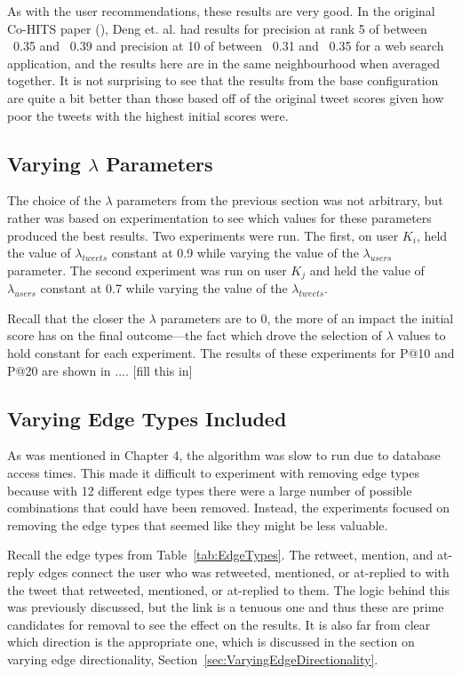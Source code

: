 As with the user recommendations, these results are very good. In the original Co-HITS paper (\cite{Deng2009}), Deng et. al. had results for precision at rank 5 of between ~0.35 and ~0.39 and precision at 10 of between ~0.31 and ~0.35 for a web search application, and the results here are in the same neighbourhood when averaged together. It is not surprising to see that the results from the base configuration are quite a bit better than those based off of the original tweet scores given how poor the tweets with the highest initial scores were.



\subsection{Varying $\lambda$ Parameters}
\label{sec:VaryingLambda}

The choice of the $\lambda$ parameters from the previous section was not arbitrary, but rather was based on experimentation to see which values for these parameters produced the best results. Two experiments were run. The first, on user $K_{i}$, held the value of $\lambda_{tweets}$ constant at 0.9 while varying the value of the $\lambda_{users}$ parameter. The second experiment was run on user $K_{j}$ and held the value of $\lambda_{users}$ constant at 0.7 while varying the value of the $\lambda_{tweets}$.

Recall that the closer the $\lambda$ parameters are to 0, the more of an impact the initial score has on the final outcome---the fact which drove the selection of $\lambda$ values to hold constant for each experiment. The results of these experiments for P@10 and P@20 are shown in .... [fill this in]



\subsection{Varying Edge Types Included}
\label{sec:VaryingEdgeTypes}

As was mentioned in Chapter 4, the algorithm was slow to run due to database access times. This made it difficult to experiment with removing edge types because with 12 different edge types there were a large number of possible combinations that could have been removed. Instead, the experiments focused on removing the edge types that seemed like they might be less valuable.

Recall the edge types from Table~\ref{tab:EdgeTypes}. The retweet, mention, and at-reply edges connect the user who was retweeted, mentioned, or at-replied to with the tweet that retweeted, mentioned, or at-replied to them. The logic behind this was previously discussed, but the link is a tenuous one and thus these are prime candidates for removal to see the effect on the results. It is also far from clear which direction is the appropriate one, which is discussed in the section on varying edge directionality, Section~\ref{sec:VaryingEdgeDirectionality}.

